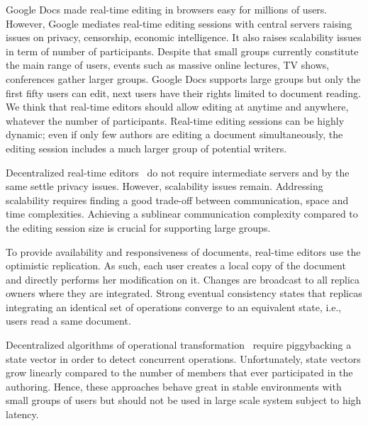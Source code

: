
Google Docs made real-time editing in browsers easy for millions of
users. However, Google mediates real-time editing sessions with central servers
raising issues on privacy, censorship, economic intelligence. It also raises
scalability issues in term of number of participants.  Despite that small groups
currently constitute the main range of users, events such as massive online
lectures, TV shows, conferences gather larger groups.  Google Docs supports
large groups but only the first fifty users can edit, next users have their
rights limited to document reading. We think that real-time editors should allow
editing at anytime and anywhere, whatever the number of participants.  Real-time
editing sessions can be highly dynamic; even if only few authors are editing a
document simultaneously, the editing session includes a much larger group of
potential writers.


Decentralized real-time editors~\cite{oster2006data, sun1998operational,
  sun2009contextbased} do not require intermediate servers and by the same
settle privacy issues. However, scalability issues remain.  Addressing
scalability requires finding a good trade-off between communication, space and
time complexities. Achieving a sublinear communication complexity compared to
the editing session size is crucial for supporting large groups.


To provide availability and responsiveness of documents, real-time editors use
the optimistic replication. As such, each user creates a local copy of the
document and directly performs her modification on it. Changes are broadcast to
all replica owners where they are integrated. Strong eventual consistency states
that replicas integrating an identical set of operations converge to an
equivalent state, i.e., users read a same document.

Decentralized algorithms of operational
transformation~\cite{sun2009contextbased} require piggybacking a state vector in
order to detect concurrent operations. Unfortunately, state vectors grow
linearly compared to the number of members that ever participated in the
authoring. Hence, these approaches behave great in stable environments with
small groups of users but should not be used in large scale system subject to
high latency.

